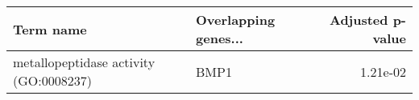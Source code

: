 \begin{tabular}{llr}
\toprule
                             Term name & Overlapping genes... &  Adjusted p-value \\
\midrule
metallopeptidase activity (GO:0008237) &                 BMP1 &          1.21e-02 \\
\bottomrule
\end{tabular}
